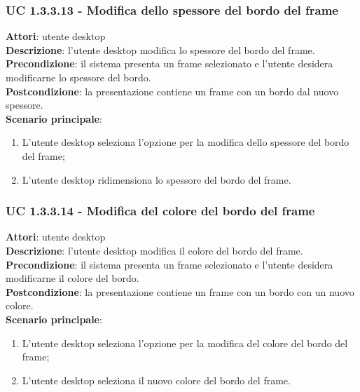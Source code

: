 \subsubsection{UC 1.3.3.13 - Modifica dello spessore del bordo del frame}{
	\label{uc1.3.3.13}
	\textbf{Attori}: utente desktop \\
	\textbf{Descrizione}: l'utente desktop modifica lo spessore del bordo del frame. \\
	\textbf{Precondizione}: il sistema presenta un frame selezionato e l'utente desidera modificarne lo spessore del bordo.	\\
	\textbf{Postcondizione}: la presentazione contiene un frame con un bordo dal nuovo spessore.	\\
	\textbf{Scenario principale}:
	\begin{enumerate}
		\item L'utente desktop seleziona l'opzione per la modifica dello spessore del bordo del frame;
		\item L'utente desktop ridimensiona lo spessore del bordo del frame.
	\end{enumerate}
	}
\subsubsection{UC 1.3.3.14 - Modifica del colore del bordo del frame}{
	\label{uc1.3.3.14}
	\textbf{Attori}: utente desktop \\
	\textbf{Descrizione}: l'utente desktop modifica il colore del bordo del frame. \\
	\textbf{Precondizione}: il sistema presenta un frame selezionato e l'utente desidera modificarne il colore del bordo.	\\
	\textbf{Postcondizione}: la presentazione contiene un frame con un bordo con un nuovo colore.	\\
	\textbf{Scenario principale}:
	\begin{enumerate}
		\item L'utente desktop seleziona l'opzione per la modifica del colore del bordo del frame;
		\item L'utente desktop seleziona il nuovo colore del bordo del frame.
	\end{enumerate}
	}
